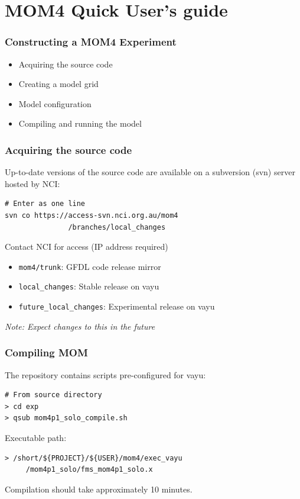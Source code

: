 \documentclass[red]{beamer}
\begin{document}
\section{MOM4 Quick User's guide}
\begin{frame}
    \frametitle{Constructing a MOM4 Experiment}
    
    \begin{itemize}
        \item Acquiring the source code
        \item Creating a model grid
        \item Model configuration
        \item Compiling and running the model
    \end{itemize}

\end{frame}

\begin{frame}[fragile]
    \frametitle{Acquiring the source code}
    
    Up-to-date versions of the source code are available on a subversion (svn)
    server hosted by NCI:
    
    \begin{lstlisting}
# Enter as one line
svn co https://access-svn.nci.org.au/mom4
               /branches/local_changes
    \end{lstlisting}
    Contact NCI for access (IP address required)
    
    \begin{itemize}
        \item \lstinline|mom4/trunk|: GFDL code release mirror
        \item \lstinline|local_changes|: Stable release on vayu
        \item \lstinline|future_local_changes|: Experimental release on vayu
    \end{itemize}
    
    \textit{Note: Expect changes to this in the future}
\end{frame}

\begin{frame}[fragile]
    \frametitle{Compiling MOM}
    
    The repository contains scripts pre-configured for vayu:
    \begin{lstlisting}
# From source directory
> cd exp
> qsub mom4p1_solo_compile.sh
    \end{lstlisting}
    
    Executable path:
    \begin{lstlisting}
> /short/${PROJECT}/${USER}/mom4/exec_vayu
     /mom4p1_solo/fms_mom4p1_solo.x
    \end{lstlisting}
    
    Compilation should take approximately 10 minutes. 
\end{frame}
\end{document}
